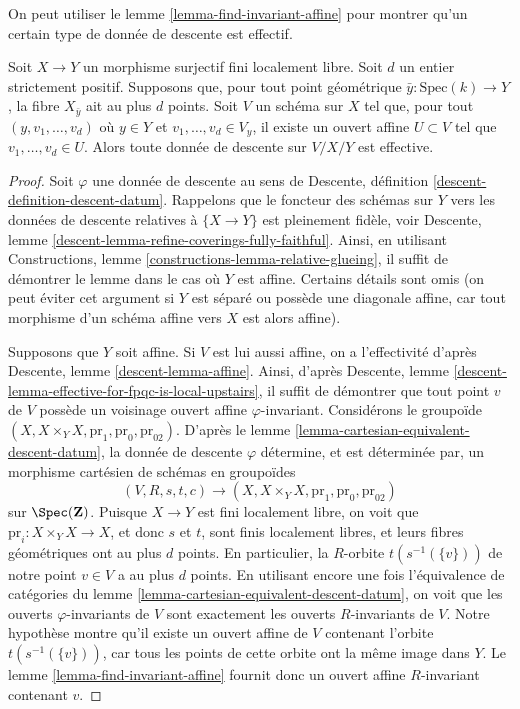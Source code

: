 \noindent
On peut utiliser le lemme \ref{lemma-find-invariant-affine}
pour montrer qu'un certain type de donnée de descente est effectif.

\begin{lemma}
\label{lemma-descend-along-finite-with-bound}
Soit $X \to Y$ un morphisme surjectif fini localement libre.
Soit $d$ un entier strictement positif. Supposons que, pour tout point géométrique
$\bar{y} : \mathrm{Spec}(k) \to Y$, la fibre $X_{\bar{y}}$
ait au plus $d$ points.
Soit $V$ un schéma sur $X$ tel que, pour tout
$(y, v_1, \ldots, v_d)$ où $y \in Y$ et
$v_1, \ldots, v_d \in V_y$, il existe un ouvert affine
$U \subset V$ tel que $v_1, \ldots, v_d \in U$.
Alors toute donnée de descente sur $V/X/Y$ est effective.
\end{lemma}

\begin{proof}
Soit $\varphi$ une donnée de descente au sens de
Descente, définition \ref{descent-definition-descent-datum}.
Rappelons que le foncteur des schémas sur $Y$ vers les données de descente
relatives à $\{X \to Y\}$ est pleinement fidèle, voir
Descente, lemme \ref{descent-lemma-refine-coverings-fully-faithful}.
Ainsi, en utilisant Constructions, lemme \ref{constructions-lemma-relative-glueing},
il suffit de démontrer le lemme dans le cas où $Y$ est affine.
Certains détails sont omis (on peut éviter cet argument si $Y$ est
séparé ou possède une diagonale affine, car tout morphisme d'un
schéma affine vers $X$ est alors affine).

\medskip\noindent
Supposons que $Y$ soit affine. Si $V$ est lui aussi affine, on a l'effectivité d'après
Descente, lemme \ref{descent-lemma-affine}. Ainsi, d'après
Descente, lemme \ref{descent-lemma-effective-for-fpqc-is-local-upstairs},
il suffit de démontrer que tout point $v$ de $V$ possède un voisinage ouvert affine $\varphi$-invariant.
Considérons le groupoïde
$(X, X \times_Y X, \text{pr}_1, \text{pr}_0, \text{pr}_{02})$.
D'après le lemme \ref{lemma-cartesian-equivalent-descent-datum},
la donnée de descente $\varphi$ détermine, et est déterminée par,
un morphisme cartésien de schémas en groupoïdes
$$
(V, R, s, t, c)
\longrightarrow
(X, X \times_Y X, \text{pr}_1, \text{pr}_0, \text{pr}_{02})
$$
sur $\Spec(\mathbf{Z})$.
Puisque $X \to Y$ est fini localement libre, on voit que
$\text{pr}_i : X \times_Y X \to X$, et donc $s$ et $t$,
sont finis localement libres, et leurs fibres géométriques ont au plus $d$
points. En particulier, la $R$-orbite $t(s^{-1}(\{v\}))$ de notre point
$v \in V$ a au plus $d$ points. En utilisant encore une fois l'équivalence de catégories du
lemme \ref{lemma-cartesian-equivalent-descent-datum},
on voit que les ouverts $\varphi$-invariants de $V$
sont exactement les ouverts $R$-invariants de $V$.
Notre hypothèse montre qu'il existe un ouvert affine de $V$
contenant l'orbite $t(s^{-1}(\{v\}))$, car tous les points
de cette orbite ont la même image dans $Y$.
Le lemme \ref{lemma-find-invariant-affine}
fournit donc un ouvert affine $R$-invariant contenant $v$.
\end{proof}

